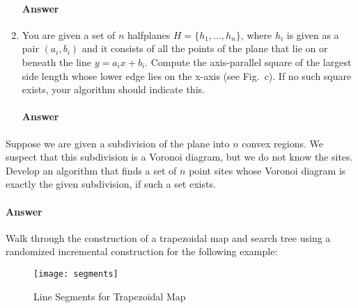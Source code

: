 \documentclass{article}
\begin{document}
\begin{enumerate}
        \paragraph{Answer}

    \item You are given a set of $n$ halfplanes $H = \{h_1,\ldots,h_n\}$, where
        $h_i$ is given as a pair $(a_i,b_i)$ and it consists of all the points
        of the plane that lie on or beneath the line $y = a_ix + b_i$. Compute
        the axis-parallel square of the largest side length whose lower edge
        lies on the x-axis (see Fig.~c). If no such square exists, your
        algorithm should indicate this.


        \paragraph{Answer}

\end{enumerate}


\collab{\todo{}}

Suppose we are given a subdivision of the plane into $n$ convex regions. We
suspect that this subdivision is a Voronoi diagram, but we do not know the
sites. Develop an algorithm that finds a set of $n$ point sites whose Voronoi
diagram is exactly the given subdivision, if such a set exists.

\paragraph{Answer}


\collab{\todo{}}

Walk through the construction of a trapezoidal map and search tree using a
randomized incremental construction for the following example:

\begin{figure}[h]
    \centering
    \texttt{[image: segments]}
    \caption{Line Segments for Trapezoidal Map}
\end{figure}
\end{document}
